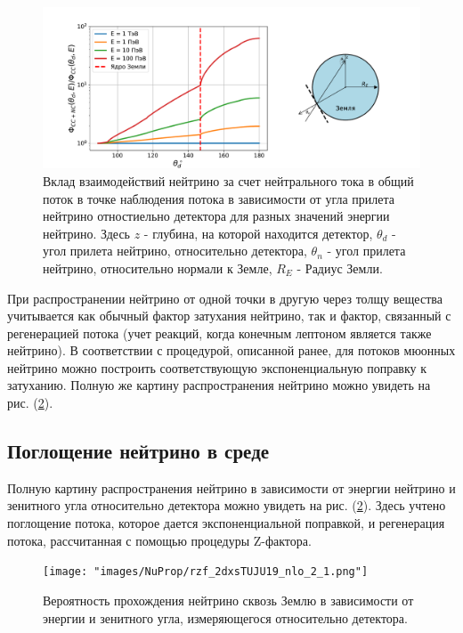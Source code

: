 \begin{figure}[!h]
\centering
\includegraphics[width=1.1\linewidth]{"images/NuProp/rhh12zf_flux_index_CT18ZNNLO.pdf"}
\caption{Вклад взаимодействий нейтрино за счет нейтрального тока в общий поток в точке наблюдения потока в зависимости от угла прилета нейтрино отностиельно детектора для разных значений энергии нейтрино. Здесь $z$ - глубина, на которой находится детектор, $\theta_d$ - угол прилета нейтрино, относительно детектора, $\theta_n$ - угол прилета нейтрино, относительно нормали к Земле, $R_E$ - Радиус Земли.}
\label{EF1}
\end{figure}
При распространении нейтрино от одной точки в другую через толщу вещества учитывается как обычный фактор затухания нейтрино, так и фактор, связанный с регенерацией потока (учет реакций, когда конечным лептоном является также нейтрино). В соответствии с процедурой, описанной ранее, для потоков мюонных нейтрино можно построить соответствующую экспоненциальную поправку к затуханию. Полную же картину распространения нейтрино можно увидеть на рис. (\ref{EF2}).
\subsection{Поглощение нейтрино в среде }
 Полную картину распространения нейтрино в зависимости от энергии нейтрино и зенитного угла относительно детектора  можно увидеть на рис. (\ref{EF2}). Здесь учтено поглощение потока, которое дается экспоненциальной поправкой, и регенерация потока, рассчитанная с помощью процедуры Z-фактора.
 \begin{figure}[!h]
\centering
\texttt{[image: "images/NuProp/rzf\_2dxsTUJU19\_nlo\_2\_1.png"]}
\caption{Вероятность прохождения нейтрино сквозь Землю в зависимости от энергии и зенитного угла, измеряющегося относительно детектора.}
\label{EF2}
\end{figure}
